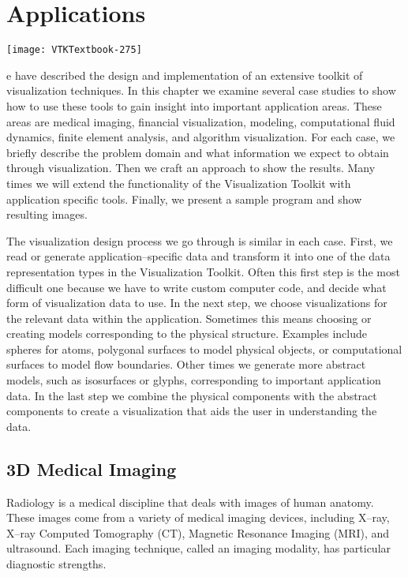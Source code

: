 \chapter[Applications]{Applications}
\label{chap:applications}

\vspace{-7\baselineskip} %
\hfill
 \begin{minipage}{0.5\textwidth}
 \centering
 \texttt{[image: VTKTextbook-275]}
 \end{minipage}
\vspace{2\baselineskip}


e have described the design and implementation of an extensive toolkit of visualization techniques.
In this chapter we examine several case studies to show how to use these tools to gain insight into important application areas.
These areas are medical imaging, financial visualization, modeling, computational fluid dynamics, finite element analysis, and algorithm visualization. For each case, we briefly describe the problem domain and what information we expect to obtain through visualization.
Then we craft an approach to show the results.
Many times we will extend the functionality of the Visualization Toolkit with application specific tools.
Finally, we present a sample program and show resulting images.

The visualization design process we go through is similar in each case.
First, we read or generate application--specific data and transform it into one of the data representation types in the Visualization Toolkit.
Often this first step is the most difficult one because we have to write custom computer code, and decide what form of visualization data to use.
In the next step, we choose visualizations for the relevant data within the application.
Sometimes this means choosing or creating models corresponding to the physical structure. Examples include spheres for atoms, polygonal surfaces to model physical objects, or computational surfaces to model flow boundaries.
Other times we generate more abstract models, such as isosurfaces or glyphs, corresponding to important application data.
In the last step we combine the physical components with the abstract components to create a visualization that aids the user in understanding the data.

\section{3D Medical Imaging}
Radiology is a medical discipline that deals with images of human anatomy.
These images come from a variety of medical imaging devices, including X--ray, X--ray Computed Tomography (CT), Magnetic Resonance Imaging (MRI), and ultrasound. Each imaging technique, called an imaging modality, has particular diagnostic strengths.


